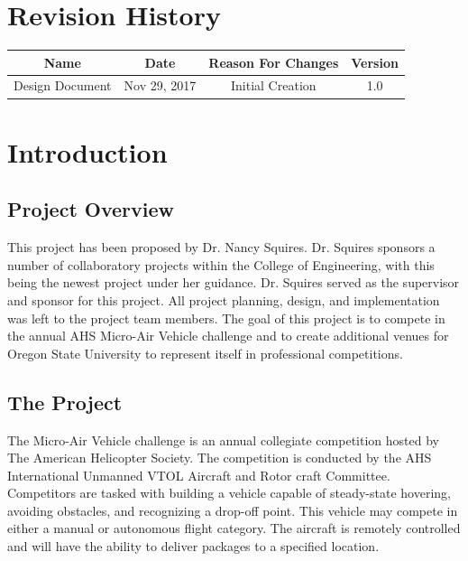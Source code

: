 \documentclass[onecolumn, draftclsnofoot,10pt, compsoc]{IEEEtran}
\begin{document}
\section*{Revision History}

\begin{center}
    \begin{tabular}{|c|c|c|c|}
        \hline
		Name & Date & Reason For Changes & Version\\
        \hline
		Design Document & Nov 29, 2017 & Initial Creation & 1.0\\
		\hline 
    \end{tabular}
\end{center}



\section{Introduction}


\subsection{Project Overview}

This project has been proposed by Dr. Nancy Squires. Dr. Squires sponsors a number of collaboratory projects within the College of Engineering, with this being the newest project under her guidance. Dr. Squires served as the supervisor and sponsor for this project. All project planning, design, and implementation was left to the project team members. The goal of this project is to compete in the annual AHS Micro-Air Vehicle challenge\cite{r2} and to create additional venues for Oregon State University to represent itself in professional competitions.  


\subsection{The Project}

The Micro-Air Vehicle challenge\cite{r2} is an annual collegiate competition hosted by The American Helicopter Society. The competition is conducted by the AHS International Unmanned VTOL Aircraft and Rotor craft Committee. Competitors are tasked with building a vehicle capable of steady-state hovering, avoiding obstacles, and recognizing a drop-off point. This vehicle may compete in either a manual or autonomous flight category. The aircraft is remotely controlled and will have the ability to deliver packages to a specified location.
\end{document}
